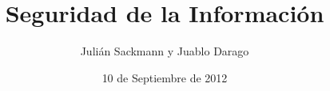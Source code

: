 \documentclass[]{article}
\title{Seguridad de la Información}
\author{ Julián Sackmann y Juablo Darago}
\date{10 de Septiembre de 2012}
\begin{document}
\newcommand{\subsubsubsection}[1]{\paragraph{#1}~\newline\indent}


\ifpdf
{}
\else
{}
\fi

\setcounter{tocdepth}{4}

\newcommand{\ig}[2]{
\begin{center}
	\texttt{[image: images/\#2]}
\end{center}}

\newcommand{\caja}[2]{\begin{center}
	\fbox{
		\parbox{#1\linewidth}{
			#2
		}
	}
\end{center}}
\renewcommand\contentsname{Índice}

\newcommand{\tab}[0]{\hspace{2cm}}
\newcommand{\partir}[4]{
\begin{minipage}[b]{#1\linewidth}\centering\begin{center}#3\end{center}\end{minipage}\begin{minipage}[b]{#2\linewidth}\centering\begin{center}#4\end{center}\end{minipage}
}
\end{document}
